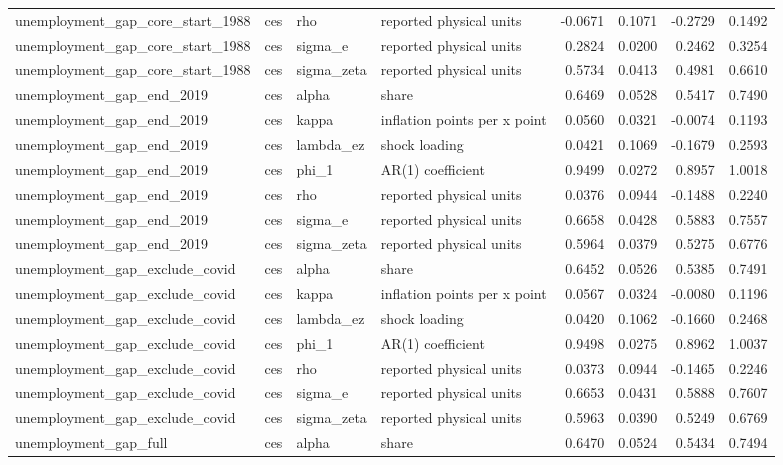 \begin{tabular}{llllrrrr}
unemployment\_gap\_core\_start\_1988 & ces & rho & reported physical units & -0.0671 & 0.1071 & -0.2729 & 0.1492 \\
unemployment\_gap\_core\_start\_1988 & ces & sigma\_e & reported physical units & 0.2824 & 0.0200 & 0.2462 & 0.3254 \\
unemployment\_gap\_core\_start\_1988 & ces & sigma\_zeta & reported physical units & 0.5734 & 0.0413 & 0.4981 & 0.6610 \\
unemployment\_gap\_end\_2019 & ces & alpha & share & 0.6469 & 0.0528 & 0.5417 & 0.7490 \\
unemployment\_gap\_end\_2019 & ces & kappa & inflation points per x point & 0.0560 & 0.0321 & -0.0074 & 0.1193 \\
unemployment\_gap\_end\_2019 & ces & lambda\_ez & shock loading & 0.0421 & 0.1069 & -0.1679 & 0.2593 \\
unemployment\_gap\_end\_2019 & ces & phi\_1 & AR(1) coefficient & 0.9499 & 0.0272 & 0.8957 & 1.0018 \\
unemployment\_gap\_end\_2019 & ces & rho & reported physical units & 0.0376 & 0.0944 & -0.1488 & 0.2240 \\
unemployment\_gap\_end\_2019 & ces & sigma\_e & reported physical units & 0.6658 & 0.0428 & 0.5883 & 0.7557 \\
unemployment\_gap\_end\_2019 & ces & sigma\_zeta & reported physical units & 0.5964 & 0.0379 & 0.5275 & 0.6776 \\
unemployment\_gap\_exclude\_covid & ces & alpha & share & 0.6452 & 0.0526 & 0.5385 & 0.7491 \\
unemployment\_gap\_exclude\_covid & ces & kappa & inflation points per x point & 0.0567 & 0.0324 & -0.0080 & 0.1196 \\
unemployment\_gap\_exclude\_covid & ces & lambda\_ez & shock loading & 0.0420 & 0.1062 & -0.1660 & 0.2468 \\
unemployment\_gap\_exclude\_covid & ces & phi\_1 & AR(1) coefficient & 0.9498 & 0.0275 & 0.8962 & 1.0037 \\
unemployment\_gap\_exclude\_covid & ces & rho & reported physical units & 0.0373 & 0.0944 & -0.1465 & 0.2246 \\
unemployment\_gap\_exclude\_covid & ces & sigma\_e & reported physical units & 0.6653 & 0.0431 & 0.5888 & 0.7607 \\
unemployment\_gap\_exclude\_covid & ces & sigma\_zeta & reported physical units & 0.5963 & 0.0390 & 0.5249 & 0.6769 \\
unemployment\_gap\_full & ces & alpha & share & 0.6470 & 0.0524 & 0.5434 & 0.7494 \\

\end{tabular}
